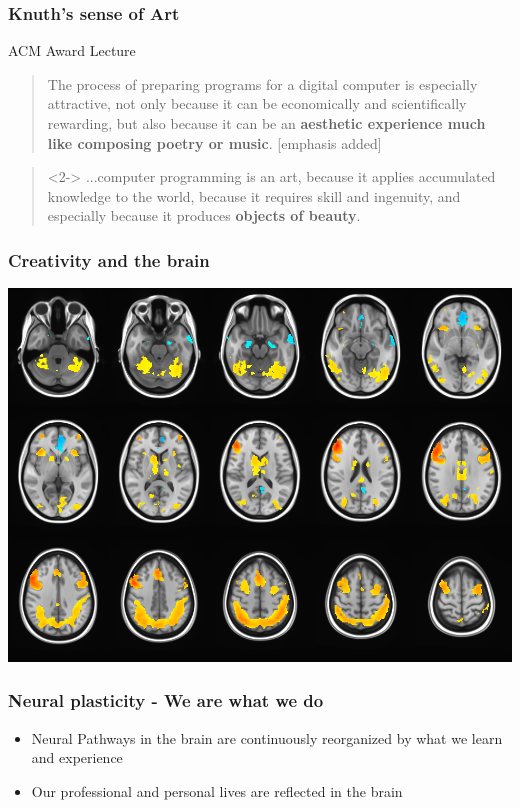 \documentclass[10pt]{beamer}
\begin{document}
\begin{frame}[fragile]
  \frametitle{Knuth's sense of Art}
  \begin{block}{ACM Award Lecture}
    \begin{quote}
    The process of preparing programs for a digital computer is especially attractive, not only because it can be economically and scientifically rewarding, but also because it can be an \textbf{aesthetic experience much like composing poetry or music}. [emphasis added]\cite[v]{Knuth1973Art}
    \end{quote}

  \begin{quote}<2->
    ...computer programming is an art, because it applies accumulated knowledge to the world, because it requires skill and ingenuity, and especially because it produces \textbf{objects of beauty}.\cite{Knuth1974Computer}
  \end{quote}
  \end{block}
\end{frame}

\begin{frame}
  \frametitle{Creativity and the brain}
  \begin{center}
    \includegraphics[height=0.75\textheight]{./media/fmri-example.png}
  \end{center}
\end{frame}

\begin{frame}
  \frametitle{Neural plasticity - We are what we do}
  \begin{itemize}[<+->]
    \item Neural Pathways in the brain are continuously reorganized by what we learn and experience
    \item Our professional and personal lives are reflected in the brain
  \end{itemize}
\end{frame}
\end{document}
